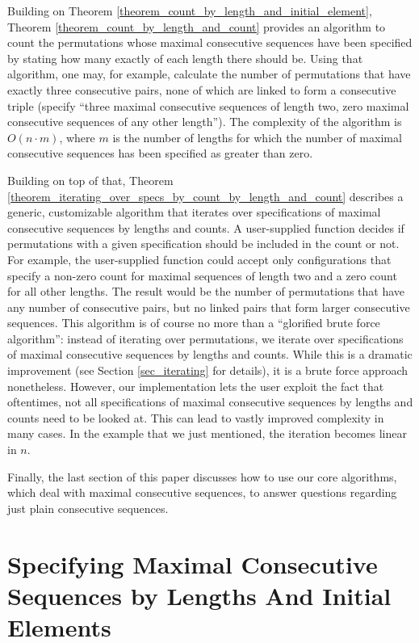 \documentclass{article}
\begin{document}
Building on Theorem \ref{theorem_count_by_length_and_initial_element}, Theorem \ref{theorem_count_by_length_and_count}
provides an algorithm to count the permutations whose maximal consecutive sequences have been specified by
stating how many exactly of each length there should be. Using that algorithm, one may, for example,
calculate the number of permutations that have exactly three consecutive pairs, none of which are linked
to form a consecutive triple (specify ``three maximal consecutive sequences of length two, zero maximal
consecutive sequences of any other length''). The complexity of the algorithm is $O(n\cdot m)$, where
$m$ is the number of lengths for which the number of maximal consecutive sequences has been specified
as greater than zero.

Building on top of that, Theorem \ref{theorem_iterating_over_specs_by_count_by_length_and_count}
describes a generic, customizable algorithm
that iterates over specifications of maximal consecutive sequences by lengths and counts.
A user-supplied function decides if permutations with a given specification should be included in the count or not.
For example, the user-supplied function could accept only configurations that specify a non-zero count for maximal
sequences of length two and a zero count for all other lengths.
The result would be the number of permutations that have any number of consecutive pairs, but no linked pairs
that form larger consecutive sequences. This algorithm is of course no more than a ``glorified brute force
algorithm'': instead of iterating over permutations, we iterate over specifications of maximal consecutive sequences
by lengths and counts. While this is a dramatic improvement (see Section \ref{sec_iterating} for details), it
is a brute force approach nonetheless. However, our implementation lets the user exploit the fact that oftentimes,
not all specifications of maximal consecutive sequences by lengths and counts need to be looked at.
This can lead to vastly improved complexity in many cases. In the example that we just mentioned, the iteration
becomes linear in $n$.

Finally, the last section of this paper discusses how to use our core algorithms, which deal with
maximal consecutive sequences, to answer questions regarding just plain consecutive sequences.

\section{Specifying Maximal Consecutive Sequences by Lengths And Initial Elements}
\end{document}
